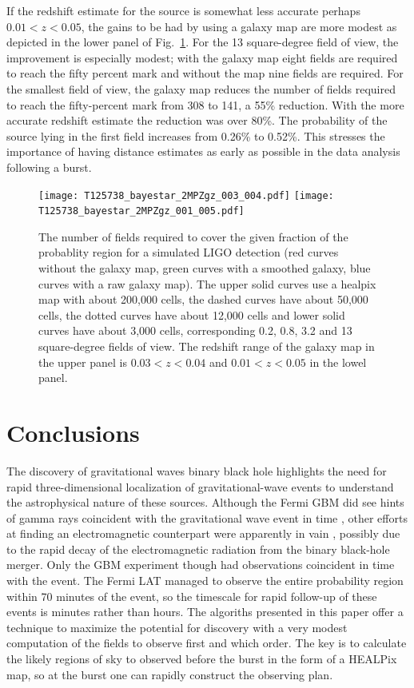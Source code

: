 \documentclass[useAMS,usenatbib]{mn2e}
\begin{document}
If the redshift estimate for the source is somewhat less accurate
perhaps $0.01<z<0.05$, the gains to be had by using a galaxy map are
more modest as depicted in the lower panel of Fig.~\ref{fig:bayestar}.
For the 13 square-degree field of view, the improvement is especially
modest; with the galaxy map eight fields are required to reach the
fifty percent mark and without the map nine fields are required.  For
the smallest field of view, the galaxy map reduces the number of
fields required to reach the fifty-percent mark from 308 to 141, a
55\% reduction.  With the more accurate redshift estimate the
reduction was over 80\%.  The probability of the source lying in the
first field increases from 0.26\% to 0.52\%.  This stresses the
importance of having distance estimates as early as possible in the
data analysis following a burst.
\begin{figure}
  \texttt{[image: T125738\_bayestar\_2MPZgz\_003\_004.pdf]}
  \texttt{[image: T125738\_bayestar\_2MPZgz\_001\_005.pdf]}
  \caption{The number of fields required to cover the given fraction
    of the probablity region for a simulated LIGO detection (red
    curves without the galaxy map, green curves with a smoothed
    galaxy, blue curves with a raw galaxy map).  The upper solid
    curves use a healpix map with about 200,000 cells, the dashed
    curves have about 50,000 cells, the dotted curves have about
    12,000 cells and lower solid curves have about 3,000 cells,
    corresponding 0.2, 0.8, 3.2 and 13 square-degree fields of
    view. The redshift range of the galaxy map in the upper panel is
    $0.03<z<0.04$ and $0.01<z<0.05$ in the lowel panel.}
  \label{fig:bayestar}
\end{figure}

\section{Conclusions}

The discovery of gravitational waves binary black hole highlights the
need for rapid three-dimensional localization of gravitational-wave
events to understand the astrophysical nature of these sources.
Although the Fermi GBM did see hints of gamma rays coincident with the
gravitational wave event in time \citep{2016arXiv160203920C}, other
efforts at finding an electromagnetic counterpart were apparently in
vain
\citep[e.g][]{2016arXiv160204198S,2016arXiv160204156S,2016arXiv160204488F},
possibly due to the rapid decay of the electromagnetic radiation from
the binary black-hole merger.  Only the GBM experiment though had
observations coincident in time with the event.  The Fermi LAT managed
to observe the entire probability region within 70 minutes of the
event, so the timescale for rapid follow-up of these events is minutes
rather than hours.  The algoriths presented in this paper offer a
technique to maximize the potential for discovery with a very modest
computation of the fields to observe first and which order.  The key
is to calculate the likely regions of sky to observed before the burst
in the form of a HEALPix map, so at the burst one can rapidly
construct the observing plan.
\end{document}
